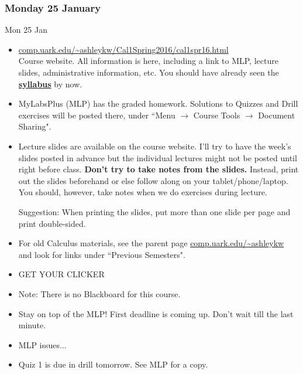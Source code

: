 \documentclass[cal1spr16Lectures.tex]{subfiles}
\begin{document}

\subsubsection{\bf Monday 25 January}
\begin{frame}[allowframebreaks]{Mon 25 Jan}
\begin{itemize}\footnotesize
\item \href{http://comp.uark.edu/~ashleykw/Cal1Spring2016/cal1spr16.html}{\alert{\url{comp.uark.edu/~ashleykw/Cal1Spring2016/cal1spr16.html}}} \\
	Course website.  All information is here, including a link to MLP, lecture slides, administrative information, etc.  You should have already seen the 
	\href{http://comp.uark.edu/~ashleykw/Cal1Spring2016/syllabusCal1Spring2016.pdf}{\alert{\textbf{syllabus}}}
	by now.
\item MyLabsPlus (MLP) has the graded homework.   Solutions to Quizzes and Drill exercises will be posted there, under ``Menu $\to$ Course Tools $\to$ Document Sharing".  
%
\framebreak 
\item Lecture slides are available on the course website.  I'll try to have the week's slides posted in advance but the individual lectures might not be posted until right before class.  \textbf{Don't try to take notes from the slides.}  Instead, print out the slides beforehand or else follow along on your tablet/phone/laptop.  You should, however, take notes when we do exercises during lecture.%

\alert{Suggestion:} When printing the slides, put more than one slide per page and print double-sided.  
%
\framebreak
\item For old Calculus materials, see the parent page \url{comp.uark.edu/~ashleykw} and look for links under ``Previous Semesters".  
%
\item GET YOUR CLICKER	
\item Note: There is no Blackboard for this course.
\item Stay on top of the MLP!  First deadline is coming up.  Don't wait till the last minute.
\item MLP issues...
\item Quiz 1 is due in drill \alert{tomorrow}.  See MLP for a copy.
\end{itemize}
\end{frame}
\end{document}
